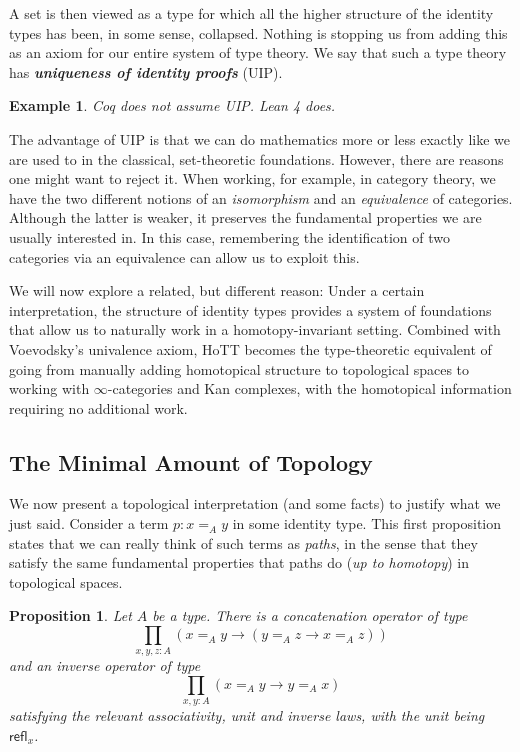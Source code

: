 \documentclass{scrartcl}
\newcommand{\textbi}[1]{\textbf{\textit{#1}}}
\newtheorem{prop}[subsection]{Proposition}
\newtheorem{ex}[subsection]{Example}
\begin{document}
A set is then viewed as a type for which all the higher structure of the identity types has been, in some sense, collapsed. Nothing is stopping us from adding this as an axiom for our entire system of type theory. We say that such a type theory has \textbi{uniqueness of identity proofs} (UIP). 

\begin{ex}
    Coq does not assume UIP. Lean 4 does.
\end{ex}

The advantage of UIP is that we can do mathematics more or less exactly like we are used to in the classical, set-theoretic foundations. However, there are reasons one might want to reject it. When working, for example, in category theory, we have the two different notions of an \textit{isomorphism} and an \textit{equivalence} of categories. Although the latter is weaker, it preserves the fundamental properties we are usually interested in. In this case, remembering the identification of two categories via an equivalence can allow us to exploit this. 
\par We will now explore a related, but different reason: Under a certain interpretation, the structure of identity types provides a system of foundations that allow us to naturally work in a homotopy-invariant setting. Combined with Voevodsky's univalence axiom, HoTT becomes the type-theoretic equivalent of going from manually adding homotopical structure to topological spaces to working with $\infty$-categories and Kan complexes, with the homotopical information requiring no additional work. 

\subsection*{The Minimal Amount of Topology}
We now present a topological interpretation (and some facts) to justify what we just said. Consider a term $p:x=_Ay$ in some identity type. This first proposition states that we can really think of such terms as \textit{paths}, in the sense that they satisfy the same fundamental properties that paths do (\textit{up to homotopy}) in topological spaces. 

\begin{prop}
    Let $A$ be a type. There is a concatenation operator of type
    $$\prod_{x,y,z:A}(x=_Ay\to (y=_Az \to x=_Az))$$
    and an inverse operator of type 
    $$\prod_{x,y:A}(x=_Ay\to y=_Ax)$$
    satisfying the relevant associativity, unit and inverse laws, with the unit being $\mathsf{refl}_x$.
\end{prop}
\end{document}
